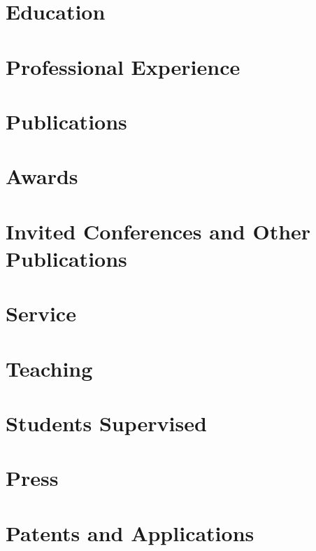 \documentclass{oneycv}
\affiliation{University of Michigan}
\begin{document}
\makecvtitle
\section{Education}

\section{Professional Experience}

\section{Publications}

\section{Awards}

\section{Invited Conferences and Other Publications}

\section{Service}

\section{Teaching}

\section{Students Supervised}

\section{Press}

\section{Patents and Applications}

\end{document}
